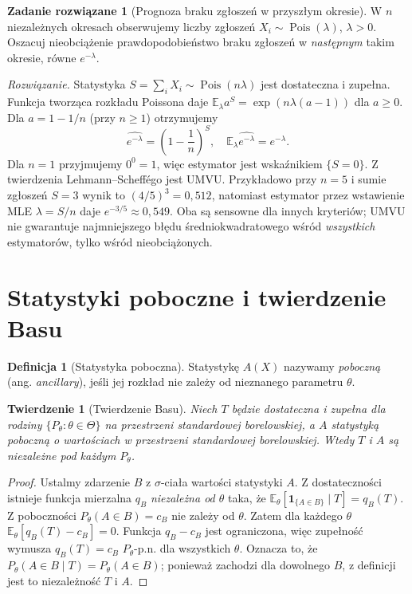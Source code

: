 \documentclass[11pt,a4paper,oneside]{report}
\numberwithin{equation}{chapter}
\theoremstyle{plain}
\newtheorem{twierdzenie}{Twierdzenie}[chapter]
\theoremstyle{definition}
\newtheorem{definicja}{Definicja}[chapter]
\newtheorem{zadanie}{Zadanie rozwiązane}[chapter]
\theoremstyle{remark}
\newcommand{\E}{\mathbb E}
\newcommand{\ind}[1]{\mathbf 1_{#1}}
\DeclareMathOperator{\Pois}{Pois}
\begin{document}
\begin{zadanie}[Prognoza braku zgłoszeń w przyszłym okresie]
\label{zad:umvu-pois-zero}
W $n$ niezależnych okresach obserwujemy liczby zgłoszeń
$X_i\sim\Pois(\lambda)$, $\lambda>0$. Oszacuj nieobciążenie
prawdopodobieństwo braku zgłoszeń w \emph{następnym} takim
okresie, równe $e^{-\lambda}$.
\par\emph{Rozwiązanie.} Statystyka $S=\sum_iX_i\sim\Pois(n\lambda)$
jest dostateczna i zupełna. Funkcja tworząca rozkładu Poissona
daje $\E_\lambda a^S=\exp(n\lambda(a-1))$ dla $a\ge0$.
Dla $a=1-1/n$ (przy $n\ge1$) otrzymujemy
\[
\widehat{e^{-\lambda}}=\left(1-\frac1n\right)^S,
\quad \E_\lambda\widehat{e^{-\lambda}}=e^{-\lambda}.
\]
Dla $n=1$ przyjmujemy $0^0=1$, więc estymator jest wskaźnikiem
$\{S=0\}$. Z twierdzenia Lehmann--Scheffégo jest UMVU.
Przykładowo przy $n=5$ i sumie zgłoszeń $S=3$ wynik to
$(4/5)^3=0{,}512$, natomiast estymator przez wstawienie MLE
$\lambda=S/n$ daje $e^{-3/5}\approx0{,}549$.
Oba są sensowne dla innych kryteriów; UMVU nie gwarantuje
najmniejszego błędu średniokwadratowego wśród \emph{wszystkich}
estymatorów, tylko wśród nieobciążonych.
\end{zadanie}

\section{Statystyki poboczne i twierdzenie Basu}
\begin{definicja}[Statystyka poboczna]
Statystykę $A(X)$ nazywamy \emph{poboczną} (ang. \emph{ancillary}),
jeśli jej rozkład nie zależy od nieznanego parametru $\theta$.
\end{definicja}

\begin{twierdzenie}[Twierdzenie Basu]\label{thm:basu}
Niech $T$ będzie dostateczna i zupełna dla rodziny
$\{P_\theta:\theta\in\Theta\}$ na przestrzeni standardowej
borelowskiej, a $A$ statystyką poboczną o wartościach w przestrzeni
standardowej borelowskiej. Wtedy $T$ i $A$ są niezależne
pod każdym $P_\theta$.
\end{twierdzenie}
\begin{proof}
Ustalmy zdarzenie $B$ z $\sigma$-ciała wartości statystyki $A$.
Z dostateczności istnieje funkcja mierzalna $q_B$ \emph{niezależna
od $\theta$} taka, że
$\E_\theta[\ind{\{A\in B\}}\mid T]=q_B(T)$.
Z poboczności $P_\theta(A\in B)=c_B$ nie zależy od $\theta$.
Zatem dla każdego $\theta$
$\E_\theta[q_B(T)-c_B]=0$.
Funkcja $q_B-c_B$ jest ograniczona, więc zupełność wymusza
$q_B(T)=c_B$ $P_\theta$-p.n. dla wszystkich $\theta$.
Oznacza to, że
$P_\theta(A\in B\mid T)=P_\theta(A\in B)$;
ponieważ zachodzi dla dowolnego $B$, z definicji jest to
niezależność $T$ i $A$.
\end{proof}
\end{document}
